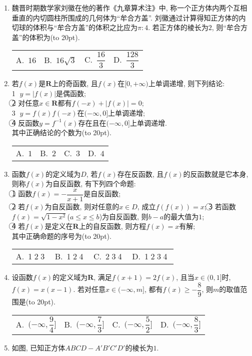 \documentclass[10pt,a4paper]{article}
\newcommand{\bracket}[1]{(\hbox to #1pt{})}
\newcommand{\fourch}[4]{\par\begin{tabular}{p{.23\textwidth}p{.23\textwidth}p{.23\textwidth}p{.23\textwidth}}
A.~#1 &B.~#2& C.~#3& D.~#4
\end{tabular}}
\begin{document}
\begin{enumerate}[1.]
\item 魏晋时期数学家刘徽在他的著作《九章算术注》中, 称一个正方体内两个互相垂直的内切圆柱所围成的几何体为``牟合方盖''. 刘徽通过计算得知正方体的内切球的体积与``牟合方盖''的体积之比应为$\pi:4$. 若正方体的棱长为$2$, 则``牟合方盖''的体积为\bracket{20}.
\fourch{$16$}{$16\sqrt 3$}{$\dfrac{16}3$}{$\dfrac{128}3$}
\item 若$f(x)$是$\mathbf{R}$上的奇函数, 且$f(x)$在$[0,+\infty)$上单调递增, 则下列结论:\\
\textcircled{1} $y=|f(x)|$是偶函数;\\
\textcircled{2} 对任意$x\in \mathbf{R}$都有$f(-x)+|f(x)|=0$;\\
\textcircled{3} $y=f(x)f(-x)$在$(-\infty ,0]$上单调递增;\\
\textcircled{4} 反函数$y=f^{-1}(x)$存在且在$(-\infty ,0]$上单调递增.\\
其中正确结论的个数为\bracket{20}.
\fourch{$1$}{$2$}{$3$}{$4$}
\item 函数$f(x)$的定义域为$D$, 若$f(x)$存在反函数, 且$f(x)$的反函数就是它本身, 则称$f(x)$为自反函数, 有下列四个命题:\\
\textcircled{1} 函数$f(x)=-\dfrac x{x+1}$是自反函数;\\
\textcircled{2} 若$f(x)$为自反函数, 则对任意的$x\in D$, 成立$f(f(x))=x$;
\textcircled{3} 若函数$f(x)=\sqrt {1-x^2}$($a\le x\le b$)为自反函数, 则$b-a$的最大值为$1$;\\
\textcircled{4} 若$f(x)$是定义在$\mathbf{R}$上的自反函数, 则方程$f(x)=x$有解;\\
其中正确命题的序号为\bracket{20}.
\fourch{\textcircled{1}\textcircled{2}\textcircled{3}}{\textcircled{1}\textcircled{2}\textcircled{4}}{\textcircled{2}\textcircled{3}\textcircled{4}}{\textcircled{1}\textcircled{2}\textcircled{3}\textcircled{4}}
\item 设函数$f(x)$的定义域为$\mathbf{R}$, 满足$f(x+1)=2f(x)$, 且当$x\in (0,1]$时, $f(x)=x(x-1)$.
若对任意$x\in (-\infty ,m]$, 都有$f(x)\ge -\dfrac 89$, 则$m$的取值范围是\bracket{20}.
\fourch{$(-\infty ,\dfrac 94]$}{$(-\infty ,\dfrac 73]$}{$(-\infty ,\dfrac 52]$}{$(-\infty ,\dfrac 83]$}
\item 如图, 已知正方体$ABCD-A'B'C'D'$的棱长为$1$.
\begin{center}
\end{center}
\end{enumerate}
\end{document}

